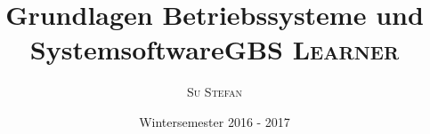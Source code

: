 \documentclass[a4paper]{article}
\title{Grundlagen Betriebssysteme und Systemsoftware}
\date{Wintersemester 2016 - 2017}
\begin{document}
	\title{\textsc{GBS Learner}}
	\date{}
	\author{\textsc{Su Stefan}}
	\maketitle
	\tableofcontents

	
	
	
	
	
	
	
	
	
	
\end{document}
